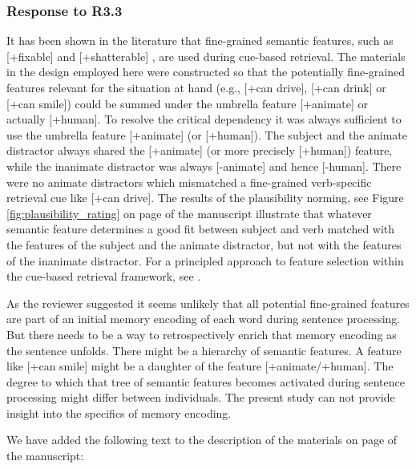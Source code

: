 \documentclass[12pt]{article}
\begin{document}
\subsubsection*{Response to R3.3}
It has been shown in the literature that fine-grained semantic features, such as [+fixable] \citep{vandyke_mcelree06} and [+shatterable] \citep{cunnings_sturt_2018retrieval}, are used during cue-based retrieval. The materials in the design employed here were constructed so that the potentially fine-grained features relevant for the situation at hand (e.g., [+can drive], [+can drink] or [+can smile]) could be summed under the umbrella feature [+animate] or actually [+human]. To resolve the critical dependency it was always sufficient to use the umbrella feature [+animate] (or [+human]). The subject and the animate distractor always shared the [+animate] (or more precisely [+human]) feature, while the inanimate distractor was always [-animate] and hence [-human]. There were no animate distractors which mismatched a fine-grained verb-specific retrieval cue like [+can drive]. The results of the plausibility norming, see Figure \ref{fig:plausibility_rating} on page \pageref{fig:plausibility_rating} of the manuscript illustrate that whatever semantic feature determines a good fit between subject and verb matched with the features of the subject and the animate distractor, but not with the features of the inanimate distractor. For a principled approach to feature selection within the cue-based retrieval framework, see \textcite{smith2020principled}.

As the reviewer suggested it seems unlikely that all potential fine-grained features are part of an initial memory encoding of each word during sentence processing. But there needs to be a way to retrospectively enrich that memory encoding as the sentence unfolds. There might be a hierarchy of semantic features. A feature like [+can smile] might be a daughter of the feature [+animate/+human]. The degree to which that tree of semantic features becomes activated during sentence processing might differ between individuals. The present study can not provide insight into the specifics of memory encoding. 

We have added the following text to the description of the materials on page \pageref{semantic_features_encoding} of the manuscript:

\begin{quote}
\end{quote}
\end{document}
